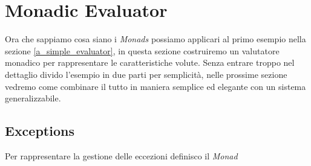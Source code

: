 \section{Monadic Evaluator}
\label{monadic_evaluator}

Ora che sappiamo cosa siano i \textit{Monads} possiamo applicari al primo
esempio nella sezione \ref{a_simple_evaluator}, in questa sezione costruiremo un
valutatore monadico per rappresentare le caratteristiche volute.
Senza entrare troppo nel dettaglio divido l'esempio in due parti per semplicità,
nelle prossime sezione vedremo come combinare il tutto in maniera semplice ed
elegante con un sistema generalizzabile.

\subsection{Exceptions}
\label{exceptions}
Per rappresentare la gestione delle eccezioni definisco il \textit{Monad}

